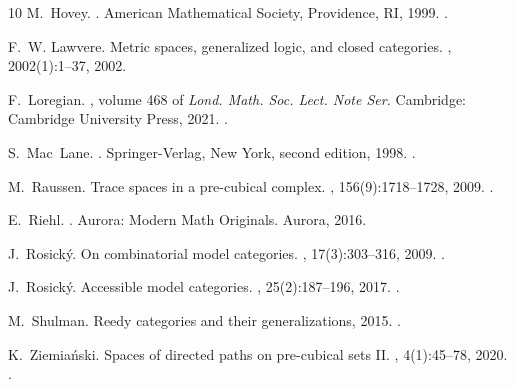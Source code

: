 \documentclass[a4paper,12pt]{amsart}
\theoremstyle{definition}
\begin{document}
\begin{thebibliography}{10}
	M.~Hovey.
	.
	\newblock American Mathematical Society, Providence, RI, 1999.
	\newblock \href {https://doi.org/10.1090/surv/063}
	{}.
	
	F.~W. Lawvere.
	\newblock Metric spaces, generalized logic, and closed categories.
	, 2002(1):1--37, 2002.
	
	F.~Loregian.
	, volume 468 of {\em Lond. Math. Soc. Lect.
		Note Ser.}
	\newblock Cambridge: Cambridge University Press, 2021.
	\newblock \href {https://doi.org/10.1017/9781108778657}
	{}.
	
	S.~Mac~Lane.
	.
	\newblock Springer-Verlag, New York, second edition, 1998.
	\newblock \href {https://doi.org/10.1007/978-1-4757-4721-8}
	{}.
	
	M.~Raussen.
	\newblock Trace spaces in a pre-cubical complex.
	, 156(9):1718--1728, 2009.
	\newblock \href {https://doi.org/10.1016/j.topol.2009.02.003}
	{}.
	
	E.~Riehl.
	.
	\newblock Aurora: Modern Math Originals. Aurora, 2016.
	
	J.~Rosick{\'y}.
	\newblock On combinatorial model categories.
	, 17(3):303--316, 2009.
	\newblock \href {https://doi.org/10.1007/s10485-008-9171-2}
	{}.
	
	J.~Rosick{\'y}.
	\newblock Accessible model categories.
	, 25(2):187--196, 2017.
	\newblock \href {https://doi.org/10.1007/s10485-015-9419-6}
	{}.
	
	M.~Shulman.
	\newblock Reedy categories and their generalizations, 2015.
	\newblock \href {https://doi.org/10.48550/arXiv.1507.01065}
	{}.
	
	K.~Ziemia\'{n}ski.
	\newblock Spaces of directed paths on pre-cubical sets {II}.
	, 4(1):45--78, 2020.
	\newblock \href {https://doi.org/10.1007/s41468-019-00040-z}
	{}.
	
\end{thebibliography}


\end{document}
